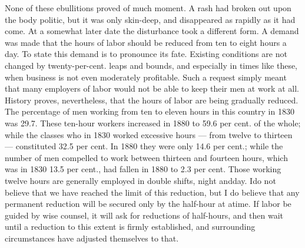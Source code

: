 \documentclass[11pt,openany]{book}
\begin{document}
None of these ebullitions proved of much moment. A rash had broken out upon the body politic, but it was only skin-deep, and disappeared as rapidly as it had come. At a somewhat later date the disturbance took a different form. A demand was made that the hours of labor should be reduced from ten to eight hours a day. To state this demand is to pronounce its fate. Existing conditions are not changed by twenty-per-cent. leaps and bounds, and especially in times like these, when business is not even moderately profitable. Such a request simply meant that many employers of labor would not be able to keep their men at work at all. History proves, nevertheless, that the hours of labor are being gradually reduced. The percentage of men working from ten to eleven hours in this country in 1830 was 29.7. These ten-hour workers increased in 1880 to 59.6 per cent. of the whole; while the classes who in 1830 worked excessive hours --- from twelve to thirteen --- constituted 32.5 per cent. In 1880 they were only 14.6 per cent.; while the number of men compelled to work between thirteen and fourteen hours, which was in 1830 13.5 per cent., had fallen in 1880 to 2.3 per cent. Those working twelve hours are generally employed in double shifts, night andday. Ido not believe that we have reached the limit of this reduction, but I do believe that any permanent reduction will be secured only by the half-hour at atime. If labor be guided by wise counsel, it will ask for reductions of half-hours, and then wait until a reduction to this extent is firmly established, and surrounding circumstances have adjusted themselves to that.
\end{document}
